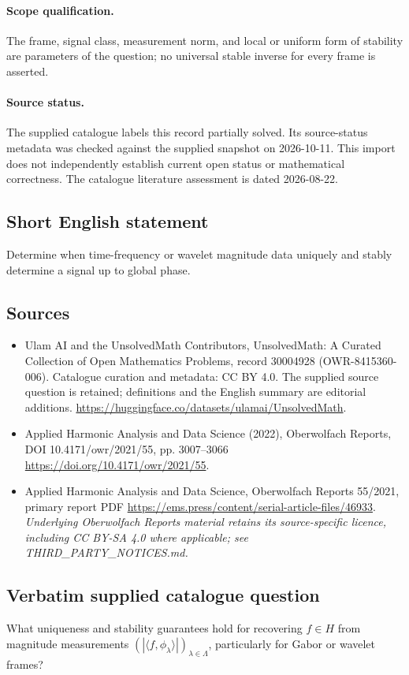 \documentclass[11pt]{article}
\begin{document}
\paragraph{Scope qualification.}
The frame, signal class, measurement norm, and local or uniform form of stability are parameters of the question; no universal stable inverse for every frame is asserted.
\paragraph{Source status.}
The supplied catalogue labels this record partially solved. Its source-status metadata was checked against the supplied snapshot on 2026-10-11. This import does not independently establish current open status or mathematical correctness. The catalogue literature assessment is dated 2026-08-22.
\subsection{Short English statement}
Determine when time-frequency or wavelet magnitude data uniquely and stably determine a signal up to global phase.
\subsection{Sources}
\begin{itemize}
\item[S1] Ulam AI and the UnsolvedMath Contributors, UnsolvedMath: A Curated Collection of Open Mathematics Problems, record 30004928 (OWR-8415360-006). Catalogue curation and metadata: CC BY 4.0. The supplied source question is retained; definitions and the English summary are editorial additions.
\url{https://huggingface.co/datasets/ulamai/UnsolvedMath}.
\item[S2] Applied Harmonic Analysis and Data Science (2022), Oberwolfach Reports, DOI 10.4171/owr/2021/55, pp. 3007--3066
\url{https://doi.org/10.4171/owr/2021/55}.
\item[S3] Applied Harmonic Analysis and Data Science, Oberwolfach Reports 55/2021, primary report PDF
\url{https://ems.press/content/serial-article-files/46933}.
\textit{Underlying Oberwolfach Reports material retains its source-specific licence, including CC BY-SA 4.0 where applicable; see THIRD\_PARTY\_NOTICES.md.}
\end{itemize}
\subsection{Verbatim supplied catalogue question}
What uniqueness and stability guarantees hold for recovering $f\in H$ from magnitude measurements $(|\langle f,\phi_\lambda\rangle|)_{\lambda\in\Lambda}$, particularly for Gabor or wavelet frames?
\end{document}
